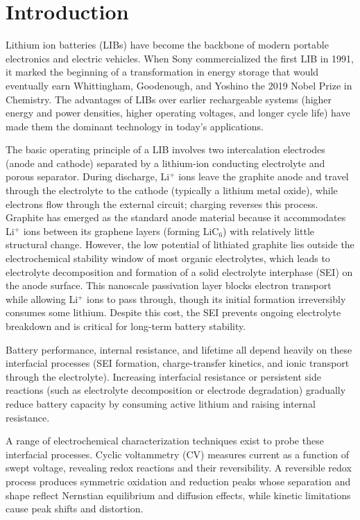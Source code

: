 \chapter{Introduction}
\setcounter{page}{1}


Lithium ion batteries (LIBs) have become the backbone of modern portable electronics and electric vehicles.\supercite{Goodenough2013} When Sony commercialized the first LIB in 1991,\supercite{VanNoorden2014} it marked the beginning of a transformation in energy storage that would eventually earn Whittingham, Goodenough, and Yoshino the 2019 Nobel Prize in Chemistry.\supercite{Goodenough2013} The advantages of LIBs over earlier rechargeable systems (higher energy and power densities, higher operating voltages, and longer cycle life)\supercite{VanNoorden2014} have made them the dominant technology in today's applications.

The basic operating principle of a LIB involves two intercalation electrodes (anode and cathode) separated by a lithium-ion conducting electrolyte and porous separator. During discharge, Li$^+$ ions leave the graphite anode and travel through the electrolyte to the cathode (typically a lithium metal oxide), while electrons flow through the external circuit; charging reverses this process. Graphite has emerged as the standard anode material because it accommodates Li$^+$ ions between its graphene layers (forming LiC$_6$) with relatively little structural change. However, the low potential of lithiated graphite lies outside the electrochemical stability window of most organic electrolytes, which leads to electrolyte decomposition and formation of a solid electrolyte interphase (SEI) on the anode surface. This nanoscale passivation layer blocks electron transport while allowing Li$^+$ ions to pass through, though its initial formation irreversibly consumes some lithium. Despite this cost, the SEI prevents ongoing electrolyte breakdown and is critical for long-term battery stability.\supercite{Goodenough2013}

Battery performance, internal resistance, and lifetime all depend heavily on these interfacial processes (SEI formation, charge-transfer kinetics, and ionic transport through the electrolyte). Increasing interfacial resistance or persistent side reactions (such as electrolyte decomposition or electrode degradation) gradually reduce battery capacity by consuming active lithium and raising internal resistance.\supercite{Goodenough2013}

A range of electrochemical characterization techniques exist to probe these interfacial processes. Cyclic voltammetry (CV) measures current as a function of swept voltage, revealing redox reactions and their reversibility. A reversible redox process produces symmetric oxidation and reduction peaks whose separation and shape reflect Nernstian equilibrium and diffusion effects, while kinetic limitations cause peak shifts and distortion.\supercite{Elgrishi2018}

